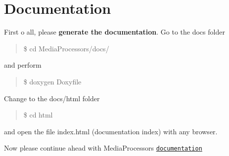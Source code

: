 \section*{Documentation }

First o all, please {\bfseries generate the documentation}. Go to the \textquotesingle{}docs\textquotesingle{} folder

\begin{quote}
\$ cd Media\+Processors/docs/ \end{quote}


and perform

\begin{quote}
\$ doxygen Doxyfile \end{quote}


Change to the \textquotesingle{}docs/html\textquotesingle{} folder

\begin{quote}
\$ cd html \end{quote}


and open the file \textquotesingle{}index.\+html\textquotesingle{} (documentation index) with any browser.

Now please continue ahead with Media\+Processors \href{docs/html/md_DOCUMENTATION.html}{\tt documentation} 